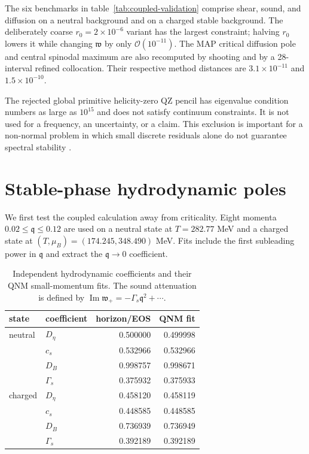 \documentclass[11pt,a4paper]{article}
\newcommand{\mub}{\mu_B}
\newcommand{\w}{\mathfrak{w}}
\newcommand{\q}{\mathfrak{q}}
\newcommand{\order}{\mathcal{O}}
\begin{document}
The six benchmarks in table~\ref{tab:coupled-validation} comprise shear,
sound, and diffusion on a neutral background and on a charged stable
background.  The deliberately coarse $r_0=2\times10^{-6}$ variant has the
largest constraint; halving $r_0$ lowers it while changing $\w$ by only
$\order(10^{-11})$.  The MAP critical diffusion pole and central spinodal
maximum are also recomputed by shooting and by a 28-interval refined
collocation.  Their respective method distances are
$3.1\times10^{-11}$ and $1.5\times10^{-10}$.

The rejected global primitive helicity-zero QZ pencil has eigenvalue condition
numbers as large as $10^{15}$ and does not satisfy continuum constraints.  It
is not used for a frequency, an uncertainty, or a claim.  This exclusion is
important for a non-normal problem in which small discrete residuals alone do
not guarantee spectral stability \cite{Jaramillo:2020tuu,Destounis:2021lum}.

\section{Stable-phase hydrodynamic poles}
\label{sec:stable}

We first test the coupled calculation away from criticality.  Eight momenta
$0.02\leq\q\leq0.12$ are used on a neutral state at $T=282.77$ MeV and a
charged state at $(T,\mub)=(174.245,348.490)$ MeV.  Fits include the first
subleading power in $\q$ and extract the $\q\to0$ coefficient.

\begin{table}[t]
 \centering
 \caption{Independent hydrodynamic coefficients and their QNM small-momentum
 fits.  The sound attenuation is defined by
 $\operatorname{Im}\w_+=-\Gamma_s\q^2+\cdots$.}
 \label{tab:hydro}
 \begin{tabular}{@{}llrr@{}}
 \toprule
 state & coefficient & horizon/EOS & QNM fit\\
 \midrule
 neutral & $D_\eta$ & 0.500000 & 0.499998\\
         & $c_s$ & 0.532966 & 0.532966\\
         & $D_B$ & 0.998757 & 0.998671\\
         & $\Gamma_s$ & 0.375932 & 0.375933\\
 \addlinespace
 charged & $D_\eta$ & 0.458120 & 0.458119\\
         & $c_s$ & 0.448585 & 0.448585\\
         & $D_B$ & 0.736939 & 0.736949\\
         & $\Gamma_s$ & 0.392189 & 0.392189\\
 \bottomrule
 \end{tabular}
\end{table}
\end{document}
